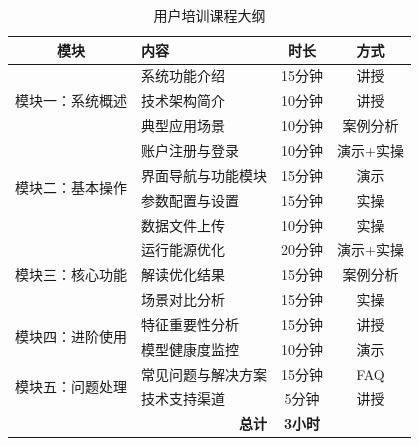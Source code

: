 \begin{table}[H]
    \centering
    \caption{用户培训课程大纲}
    \label{tab:training_outline}
    \begin{tabular}{clcc}
        \toprule
        \textbf{模块}                     & \textbf{内容}  & \textbf{时长} & \textbf{方式} \\
        \midrule
        \multirow{3}{*}{模块一：系统概述}
                                        & 系统功能介绍       & 15分钟        & 讲授          \\
                                        & 技术架构简介       & 10分钟        & 讲授          \\
                                        & 典型应用场景       & 10分钟        & 案例分析        \\
        \midrule
        \multirow{4}{*}{模块二：基本操作}
                                        & 账户注册与登录      & 10分钟        & 演示+实操       \\
                                        & 界面导航与功能模块    & 15分钟        & 演示          \\
                                        & 参数配置与设置      & 15分钟        & 实操          \\
                                        & 数据文件上传       & 10分钟        & 实操          \\
        \midrule
        \multirow{3}{*}{模块三：核心功能}
                                        & 运行能源优化       & 20分钟        & 演示+实操       \\
                                        & 解读优化结果       & 15分钟        & 案例分析        \\
                                        & 场景对比分析       & 15分钟        & 实操          \\
        \midrule
        \multirow{2}{*}{模块四：进阶使用}
                                        & 特征重要性分析      & 15分钟        & 讲授          \\
                                        & 模型健康度监控      & 10分钟        & 演示          \\
        \midrule
        \multirow{2}{*}{模块五：问题处理}
                                        & 常见问题与解决方案    & 15分钟        & FAQ         \\
                                        & 技术支持渠道       & 5分钟         & 讲授          \\
        \midrule
        \multicolumn{2}{r}{\textbf{总计}} & \textbf{3小时} &                           \\
        \bottomrule
    \end{tabular}
\end{table}

